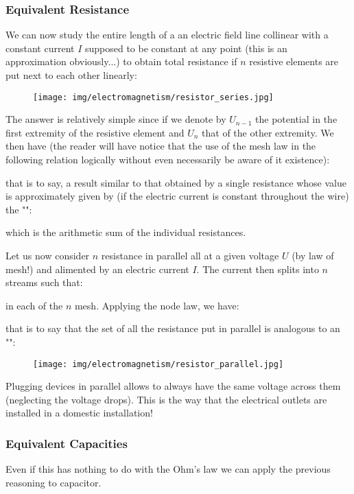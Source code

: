 	\pagebreak
	\subsubsection{Equivalent Resistance}
	We can now study the entire length of a an electric field line collinear with a constant current $I$ supposed to be constant at any point (this is an approximation obviously...) to obtain total resistance if $n$ resistive elements are put  next to each other linearly:
	\begin{figure}[H]
		\centering
		\texttt{[image: img/electromagnetism/resistor\_series.jpg]}
	\end{figure}
	
	The answer is relatively simple since if we denote by $U_{n-1}$ the potential in the first extremity of the resistive element and $U_n$ that of the other extremity. We then have (the reader will have notice that the use of the mesh law in the following relation logically without even necessarily be aware of it existence):
	
	that is to say, a result similar to that obtained by a single resistance whose value is approximately given by (if the electric current is constant throughout the wire) the "":
	
	which is the arithmetic sum of the individual resistances.

	Let us now consider $n$ resistance in parallel all at a given voltage $U$ (by law of mesh!) and alimented by an electric current $I$. The current then splits into $n$ streams such that:
	
	in each of the $n$ mesh. Applying the node law, we have:
	
	that is to say that the set of all the resistance put in parallel is analogous to an "":
	
	\begin{figure}[H]
		\centering
		\texttt{[image: img/electromagnetism/resistor\_parallel.jpg]}
	\end{figure}
	Plugging devices in parallel allows to always have the same voltage across them (neglecting the voltage drops). This is the way that the electrical outlets are installed in a domestic installation!
	
	\subsubsection{Equivalent Capacities}
	Even if this has nothing to do with the Ohm's law we can apply the previous reasoning to capacitor.
	
